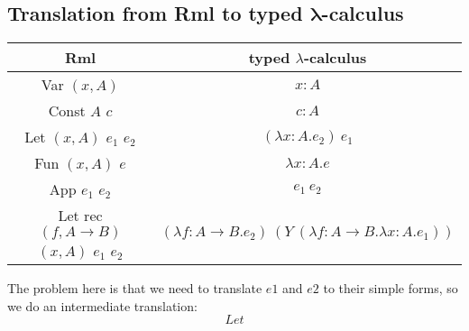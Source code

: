 \documentclass[11pt, leqno]{article}
\begin{document}
\subsection{Translation from Rml to typed $\mathbf{\lambda}$-calculus}
\begin{center}
  \begin{tabular}{|c|c|}
    \hline
    Rml & typed $\lambda$-calculus \\ \hline
    Var $(x,A)$ & $x : A$ \\
    Const $A$ $c$ & $c : A$ \\
    Let $(x,A)$ $e_1$ $e_2$ & $(\lambda x : A. e_2)~e_1$ \\
    Fun $(x,A)$ $e$ & $\lambda x : A. e$ \\
    App $e_1$ $e_2$ & $e_1~e_2$ \\
    Let rec $(f,A \rightarrow B)$ $(x,A)$ $e_1$ $e_2$ & $(\lambda f : A \rightarrow B. e_2)~(Y~(\lambda f : A \rightarrow B. \lambda x : A. e_1))$ \\ \hline
  \end{tabular}
\end{center}
The problem here is that we need to translate \(e1\) and \(e2\) to their simple forms, so we do an intermediate translation:
\[Let\]
\end{document}
